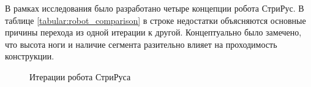 В рамках исследования было разработано четыре концепции робота СтриРус. В таблице \ref{tabular:robot_comparison} в строке недостатки объясняются основные причины перехода из одной итерации к другой. Концептуально было замечено, что высота ноги и наличие сегмента разительно влияет на проходимость конструкции. \quad {}

\begin{figure}[H]
    \caption{Итерации робота СтриРуса}\label{fig:striruses}
  \end{figure}

\vspace{-1cm}


